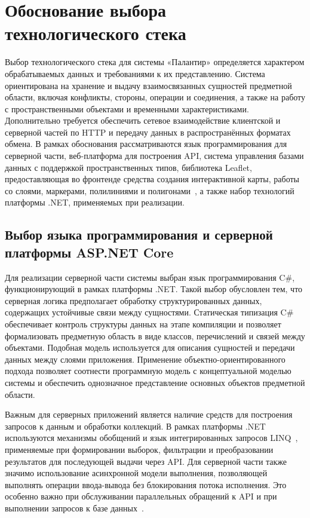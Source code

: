 \section{Обоснование выбора технологического стека}

Выбор технологического стека для системы «Палантир» определяется характером обрабатываемых данных и требованиями к их представлению. Система ориентирована на хранение и выдачу взаимосвязанных сущностей предметной области, включая конфликты, стороны, операции и соединения, а также на работу с пространственными объектами и временными характеристиками. Дополнительно требуется обеспечить сетевое взаимодействие клиентской и серверной частей по HTTP и передачу данных в распространённых форматах обмена. В рамках обоснования рассматриваются язык программирования для серверной части, веб-платформа для построения API, система управления базами данных с поддержкой пространственных типов, библиотека Leaflet, предоставляющая во фронтенде средства создания интерактивной карты, работы со слоями, маркерами, полилиниями и полигонами~\cite{leaflet_api_reference}, а также набор технологий платформы .NET, применяемых при реализации.

\subsection{Выбор языка программирования и серверной платформы ASP.NET Core}

Для реализации серверной части системы выбран язык программирования C\#, функционирующий в рамках платформы .NET. Такой выбор обусловлен тем, что серверная логика предполагает обработку структурированных данных, содержащих устойчивые связи между сущностями. Статическая типизация C\# обеспечивает контроль структуры данных на этапе компиляции и позволяет формализовать предметную область в виде классов, перечислений и связей между объектами. Подобная модель используется для описания сущностей и передачи данных между слоями приложения. Применение объектно-ориентированного подхода позволяет соотнести программную модель с концептуальной моделью системы и обеспечить однозначное представление основных объектов предметной области.

Важным для серверных приложений является наличие средств для построения запросов к данным и обработки коллекций. В рамках платформы .NET используются механизмы обобщений и язык интегрированных запросов LINQ~\cite{linq}, применяемые при формировании выборок, фильтрации и преобразовании результатов для последующей выдачи через API. Для серверной части также значимо использование асинхронной модели выполнения, позволяющей выполнять операции ввода-вывода без блокирования потока исполнения. Это особенно важно при обслуживании параллельных обращений к API и при выполнении запросов к базе данных~\cite{dotnet_docs}.

